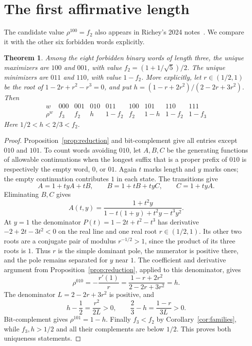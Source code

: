 \documentclass[11pt]{article}
\newtheorem{theorem}{Theorem}
\begin{document}
\section{The first affirmative length}
The candidate value $\rho^{100}=f_2$ also appears in Richey's
2024 notes~\cite[Section~2.4, Eq.~(2.50)]{R}.
We compare it with the other six forbidden words explicitly.
\begin{theorem}\label{thm:three}
Among the eight forbidden binary words of length three, the unique
maximizers are $100$ and $001$, with value
$f_2=(1+1/\sqrt5)/2$. The unique minimizers are $011$ and $110$,
with value $1-f_2$. More explicitly, let $r\in(1/2,1)$ be the root of
$1-2r+r^2-r^3=0$, and put
$h=(1-r+2r^2)/(2-2r+3r^2)$. Then
\[
\begin{array}{c|cccccccc}
w&000&001&010&011&100&101&110&111\\ \hline
\rho^w&f_3&f_2&h&1-f_2&f_2&1-h&1-f_2&1-f_3
\end{array}
\]
Here $1/2<h<2/3<f_2$.
\end{theorem}
\begin{proof}
Proposition~\ref{prop:reduction} and bit-complement give all entries except
$010$ and $101$. To count words avoiding $010$, let $A,B,C$ be the generating
functions of allowable continuations when the longest suffix that is a
proper prefix of $010$ is respectively the empty word, $0$, or $01$.
Again $t$ marks length and $y$ marks ones; the empty continuation contributes
$1$ in each state. The transitions give
\[
 A=1+tyA+tB,\qquad B=1+tB+tyC,\qquad C=1+tyA.
\]
Eliminating $B,C$ gives
\[
 A(t,y)=\frac{1+t^2y}{1-t(1+y)+t^2y-t^3y^2}.
\]
At $y=1$ the denominator $P(t)=1-2t+t^2-t^3$ has derivative
$-2+2t-3t^2<0$ on the real line and one real root $r\in(1/2,1)$.
Its other two roots are a conjugate pair of modulus $r^{-1/2}>1$,
since the product of its three roots is $1$.
Thus $r$ is the simple dominant pole, the numerator is positive there,
and the pole remains separated for $y$ near $1$.
The coefficient and derivative argument from
Proposition~\ref{prop:reduction}, applied to this denominator, gives
\[
 \rho^{010}=-\frac{r'(1)}r
 =\frac{1-r+2r^2}{2-2r+3r^2}=h.
\]
The denominator $L=2-2r+3r^2$ is positive, and
\[
 h-\frac12=\frac{r^2}{2L}>0,\qquad
 \frac23-h=\frac{1-r}{3L}>0.
\]
Bit-complement gives $\rho^{101}=1-h$.
Finally $f_3<f_2$ by Corollary~\ref{cor:families}, while
$f_3,h>1/2$ and all their complements are below $1/2$.
This proves both uniqueness statements.
\end{proof}
\end{document}
